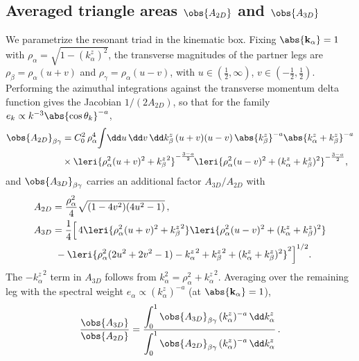 \subsection{Averaged triangle areas $\obs{A_{2D}}$ and $\obs{A_{3D}}$}

We parametrize the resonant triad in the kinematic box. Fixing $\abs{\mathbf{k}_\alpha}=1$ with $\rho_\alpha=\sqrt{1-(k_\alpha^z)^2}$, the transverse magnitudes of the partner legs are $\rho_\beta=\rho_\alpha(u+v)$ and $\rho_\gamma=\rho_\alpha(u-v)$, with $u\in(\tfrac12,\infty)$, $v\in(-\tfrac12,\tfrac12)$. Performing the azimuthal integrations against the transverse momentum delta function gives the Jacobian $1/(2A_{2D})$, so that for the family $e_k\propto k^{-3}\abs{\cos\theta_k}^{-a}$,
\begin{align}
    \obs{A_{2D}}_{\beta\gamma} &= C_0^2\,\rho_\alpha^4 \!\int\! \dd u\, \dd v\, \dd k_\beta^z\, (u+v)(u-v)\, \abs{k_\beta^z}^{-a}\abs{k_\alpha^z+k_\beta^z}^{-a}\nonumber\\
    &\times \leri{\rho_\alpha^2(u+v)^2+{k_\beta^z}^2}^{-\frac{3-a}{2}}\!\leri{\rho_\alpha^2(u-v)^2+(k_\alpha^z+k_\beta^z)^2}^{-\frac{3-a}{2}},
\end{align}
and $\obs{A_{3D}}_{\beta\gamma}$ carries an additional factor $A_{3D}/A_{2D}$ with
\begin{align}
    A_{2D} &= \frac{\rho_\alpha^2}{4}\sqrt{(1-4v^2)(4u^2-1)}\,,\\
    A_{3D} &= \frac14\Big[\,4\leri{\rho_\alpha^2(u+v)^2+{k_\beta^z}^2}\leri{\rho_\alpha^2(u-v)^2+(k_\alpha^z+k_\beta^z)^2}\nonumber\\
    &\ -\leri{\rho_\alpha^2(2u^2+2v^2-1)-{k_\alpha^z}^2+{k_\beta^z}^2+(k_\alpha^z+k_\beta^z)^2}^2\Big]^{1/2}.
\end{align}
The $-{k_\alpha^z}^2$ term in $A_{3D}$ follows from $k_\alpha^2=\rho_\alpha^2+{k_\alpha^z}^2$. Averaging over the remaining leg with the spectral weight $e_\alpha\propto(k_\alpha^z)^{-a}$ (at $\abs{\mathbf{k}_\alpha}=1$),
\begin{align}\label{eq:ratio-of-averages}
    \frac{\obs{A_{3D}}}{\obs{A_{2D}}} = \frac{\displaystyle\int_0^1 \obs{A_{3D}}_{\beta\gamma}\,(k_\alpha^z)^{-a}\,\dd k_\alpha^z}{\displaystyle\int_0^1 \obs{A_{2D}}_{\beta\gamma}\,(k_\alpha^z)^{-a}\,\dd k_\alpha^z}\,.
\end{align}

